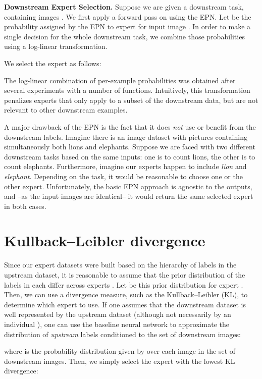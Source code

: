 \documentclass{article}
\begin{document}
\textbf{Downstream Expert Selection.} Suppose we are given a downstream task, containing images .
We first apply a forward pass on  using the EPN.
Let  be the probability assigned by the EPN to expert  for input image .
In order to make a single decision for the whole downstream task, we combine those probabilities using a log-linear transformation.

We select the expert as follows:


The log-linear combination of per-example probabilities was obtained after several experiments with a number of functions.
Intuitively, this transformation penalizes experts that only apply to a 
subset of the downstream data, but are not relevant to other downstream examples.


A major drawback of the EPN is the fact that it does \emph{not} use or benefit from the 
downstream labels.
Imagine there is an image dataset with pictures containing simultaneously both lions and elephants.
Suppose we are faced with two different downstream tasks based on the same inputs: one is to count lions, the other is to count elephants.
Furthermore, imagine our experts happen to include \emph{lion} and \emph{elephant}.
Depending on the task, it would be reasonable to choose one or the other expert.
Unfortunately, the basic EPN approach is agnostic to the outputs, and --as the input images are identical-- it would return the same selected expert in both cases.

 \section{Kullback--Leibler divergence}
\label{app:kl_routing}

Since our expert datasets  were built based on the hierarchy of labels in the
upstream dataset, it is reasonable to assume that the prior distribution of the
labels in each  differ across experts . Let  be this prior 
distribution for expert . Then, we can use a divergence measure, such as the Kullback--Leibler (KL), to determine which expert to use. If one assumes that the 
downstream dataset is well represented by the upstream dataset  (although not 
necessarily by an individual ), one can use the baseline neural network  to 
approximate the distribution of \emph{upstream} labels conditioned to the set of 
downstream images:

where  is the probability distribution given by
 over each image in the set  
of downstream images.
Then, we simply select the expert with the lowest KL divergence:
\end{document}
